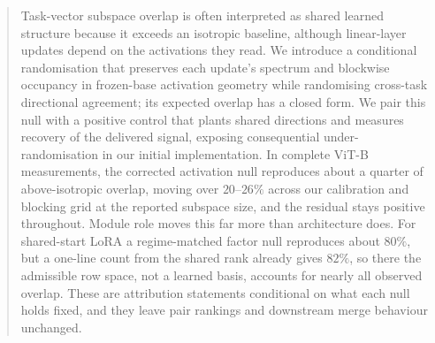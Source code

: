 \begin{abstract}
Task-vector subspace overlap is often interpreted as shared learned structure because it exceeds
an isotropic baseline, although linear-layer updates depend on the activations they read. We
introduce a conditional randomisation that preserves each update's spectrum and blockwise
occupancy in frozen-base activation geometry while randomising cross-task directional agreement;
its expected overlap has a closed form. We pair this null with a positive control that plants
shared directions and measures recovery of the delivered signal, exposing consequential
under-randomisation in our initial implementation. In complete ViT-B measurements, the corrected
activation null reproduces about a quarter of above-isotropic overlap, moving over $20$--$26\%$
across our calibration and blocking grid at the reported subspace size, and the residual stays
positive throughout. Module role moves this far
more than architecture does. For shared-start LoRA a regime-matched factor null reproduces about
$80\%$, but a one-line count from the shared rank already gives $82\%$, so there the admissible
row space, not a learned basis, accounts for nearly all observed overlap. These are attribution
statements conditional on what each null holds fixed, and they leave pair rankings and downstream
merge behaviour unchanged.
\end{abstract}
